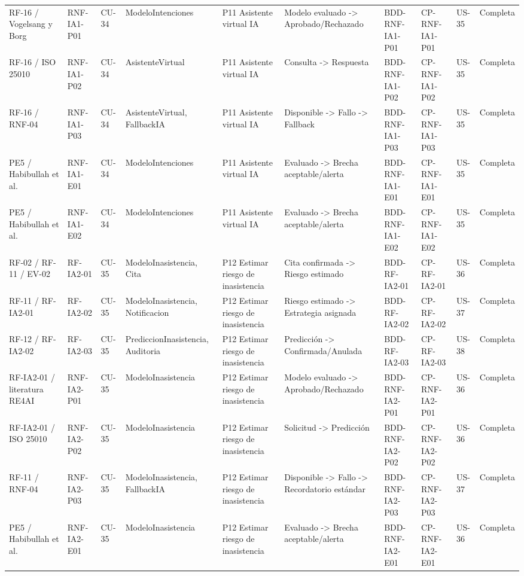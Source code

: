 \documentclass[11pt,a4paper]{article}
\begin{document}
\begin{appendices}
\begin{landscape}
\begin{longtable}{p{2.2cm}p{1.8cm}p{2cm}p{3cm}p{3cm}p{3cm}p{2cm}p{2cm}p{2cm}p{1.6cm}}
			RF-16 / Vogelsang y Borg & RNF-IA1-P01 & CU-34 & ModeloIntenciones & P11 Asistente virtual IA & Modelo evaluado -> Aprobado/Rechazado & BDD-RNF-IA1-P01 & CP-RNF-IA1-P01 & US-35 & Completa\\
			RF-16 / ISO 25010 & RNF-IA1-P02 & CU-34 & AsistenteVirtual & P11 Asistente virtual IA & Consulta -> Respuesta & BDD-RNF-IA1-P02 & CP-RNF-IA1-P02 & US-35 & Completa\\
			RF-16 / RNF-04 & RNF-IA1-P03 & CU-34 & AsistenteVirtual, FallbackIA & P11 Asistente virtual IA & Disponible -> Fallo -> Fallback & BDD-RNF-IA1-P03 & CP-RNF-IA1-P03 & US-35 & Completa\\
			PE5 / Habibullah et al. & RNF-IA1-E01 & CU-34 & ModeloIntenciones & P11 Asistente virtual IA & Evaluado -> Brecha aceptable/alerta & BDD-RNF-IA1-E01 & CP-RNF-IA1-E01 & US-35 & Completa\\
			PE5 / Habibullah et al. & RNF-IA1-E02 & CU-34 & ModeloIntenciones & P11 Asistente virtual IA & Evaluado -> Brecha aceptable/alerta & BDD-RNF-IA1-E02 & CP-RNF-IA1-E02 & US-35 & Completa\\
			RF-02 / RF-11 / EV-02 & RF-IA2-01 & CU-35 & ModeloInasistencia, Cita & P12 Estimar riesgo de inasistencia & Cita confirmada -> Riesgo estimado & BDD-RF-IA2-01 & CP-RF-IA2-01 & US-36 & Completa\\
			RF-11 / RF-IA2-01 & RF-IA2-02 & CU-35 & ModeloInasistencia, Notificacion & P12 Estimar riesgo de inasistencia & Riesgo estimado -> Estrategia asignada & BDD-RF-IA2-02 & CP-RF-IA2-02 & US-37 & Completa\\
			RF-12 / RF-IA2-02 & RF-IA2-03 & CU-35 & PrediccionInasistencia, Auditoria & P12 Estimar riesgo de inasistencia & Predicción -> Confirmada/Anulada & BDD-RF-IA2-03 & CP-RF-IA2-03 & US-38 & Completa\\
			RF-IA2-01 / literatura RE4AI & RNF-IA2-P01 & CU-35 & ModeloInasistencia & P12 Estimar riesgo de inasistencia & Modelo evaluado -> Aprobado/Rechazado & BDD-RNF-IA2-P01 & CP-RNF-IA2-P01 & US-36 & Completa\\
			RF-IA2-01 / ISO 25010 & RNF-IA2-P02 & CU-35 & ModeloInasistencia & P12 Estimar riesgo de inasistencia & Solicitud -> Predicción & BDD-RNF-IA2-P02 & CP-RNF-IA2-P02 & US-36 & Completa\\
			RF-11 / RNF-04 & RNF-IA2-P03 & CU-35 & ModeloInasistencia, FallbackIA & P12 Estimar riesgo de inasistencia & Disponible -> Fallo -> Recordatorio estándar & BDD-RNF-IA2-P03 & CP-RNF-IA2-P03 & US-37 & Completa\\
			PE5 / Habibullah et al. & RNF-IA2-E01 & CU-35 & ModeloInasistencia & P12 Estimar riesgo de inasistencia & Evaluado -> Brecha aceptable/alerta & BDD-RNF-IA2-E01 & CP-RNF-IA2-E01 & US-36 & Completa\\

\end{longtable}
\end{landscape}
\end{appendices}
\end{document}

